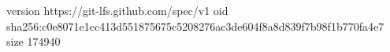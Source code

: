 version https://git-lfs.github.com/spec/v1
oid sha256:c0e8071e1cc413d551875675c5208276ac3de604f8a8d839f7b98f1b770fa4e7
size 174940
